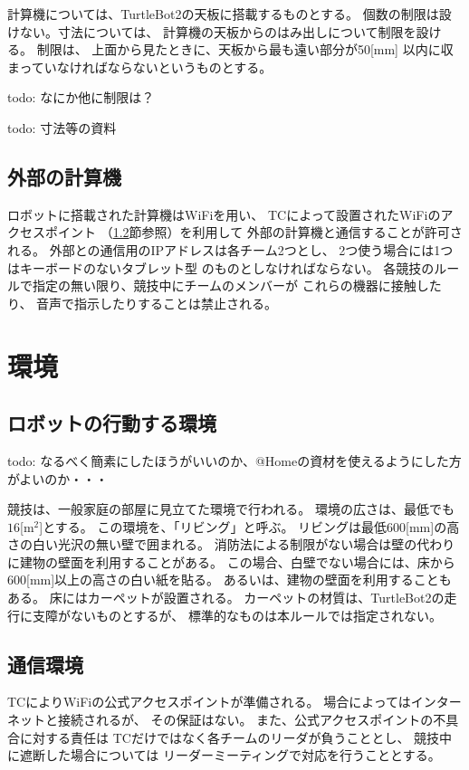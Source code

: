 \documentclass[a4j]{jarticle}
\begin{document}
計算機については、TurtleBot2の天板に搭載するものとする。
個数の制限は設けない。寸法については、
計算機の天板からのはみ出しについて制限を設ける。
制限は、
上面から見たときに、天板から最も遠い部分が50[mm]
以内に収まっていなければならないというものとする。

todo: なにか他に制限は？

todo: 寸法等の資料

\subsection{外部の計算機}

ロボットに搭載された計算機はWiFiを用い、
TCによって設置されたWiFiのアクセスポイント
（\ref{sub:network}節参照）を利用して
外部の計算機と通信することが許可される。
外部との通信用のIPアドレスは各チーム2つとし、
2つ使う場合には1つはキーボードのないタブレット型
のものとしなければならない。
各競技のルールで指定の無い限り、競技中にチームのメンバーが
これらの機器に接触したり、
音声で指示したりすることは禁止される。


\section{環境}

\subsection{ロボットの行動する環境}

todo: なるべく簡素にしたほうがいいのか、@Homeの資材を使えるようにした方がよいのか・・・

競技は、一般家庭の部屋に見立てた環境で行われる。
環境の広さは、最低でも$16$[m$^2$]とする。
この環境を、「リビング」と呼ぶ。
リビングは最低600[mm]の高さの白い光沢の無い壁で囲まれる。
消防法による制限がない場合は壁の代わりに建物の壁面を利用することがある。
この場合、白壁でない場合には、床から600[mm]以上の高さの白い紙を貼る。
あるいは、建物の壁面を利用することもある。
床にはカーペットが設置される。
カーペットの材質は、TurtleBot2の走行に支障がないものとするが、
標準的なものは本ルールでは指定されない。

\subsection{通信環境}\label{sub:network}

TCによりWiFiの公式アクセスポイントが準備される。
場合によってはインターネットと接続されるが、
その保証はない。
また、公式アクセスポイントの不具合に対する責任は
TCだけではなく各チームのリーダが負うこととし、
競技中に遮断した場合については
リーダーミーティングで対応を行うこととする。
\end{document}
